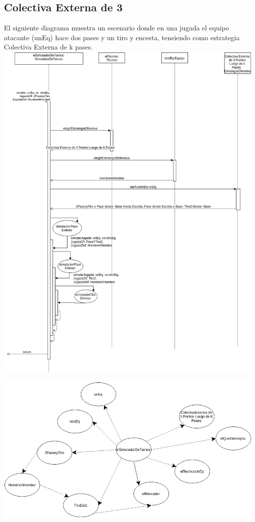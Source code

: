 \subsection{Colectiva Externa de 3}
El siguiente diagrama muestra un escenario donde en una jugada el equipo atacante (unEq) hace dos pases y un tiro y encesta, teneiendo como estrategia Colectiva Externa de k pases.
\includegraphics[width=\textwidth]{imgs/colectivaExternaDe3Secuencia.png}

\includegraphics[width=\textwidth]{imgs/colectivaExternaDe3Objetos.png}

